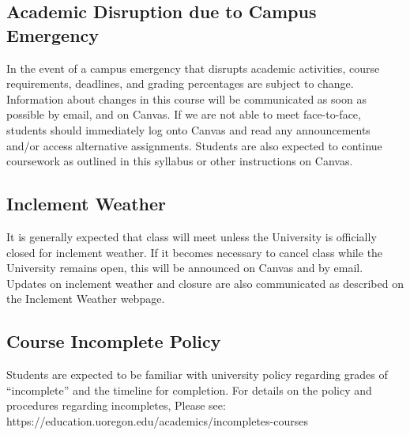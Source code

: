 \documentclass[
  letterpaper,
  DIV=11,
  numbers=noendperiod]{scrartcl}
\begin{document}
\hypertarget{academic-disruption-due-to-campus-emergency}{%
\subsection{Academic Disruption due to Campus
Emergency}\label{academic-disruption-due-to-campus-emergency}}

In the event of a campus emergency that disrupts academic activities,
course requirements, deadlines, and grading percentages are subject to
change. Information about changes in this course will be communicated as
soon as possible by email, and on Canvas. If we are not able to meet
face-to-face, students should immediately log onto Canvas and read any
announcements and/or access alternative assignments. Students are also
expected to continue coursework as outlined in this syllabus or other
instructions on Canvas.

\hypertarget{inclement-weather}{%
\subsection{Inclement Weather}\label{inclement-weather}}

It is generally expected that class will meet unless the University is
officially closed for inclement weather. If it becomes necessary to
cancel class while the University remains open, this will be announced
on Canvas and by email. Updates on inclement weather and closure are
also communicated as described on the Inclement Weather webpage.

\hypertarget{course-incomplete-policy}{%
\subsection{Course Incomplete Policy}\label{course-incomplete-policy}}

Students are expected to be familiar with university policy regarding
grades of ``incomplete'' and the timeline for completion. For details on
the policy and procedures regarding incompletes, Please see:
https://education.uoregon.edu/academics/incompletes-courses
\end{document}
